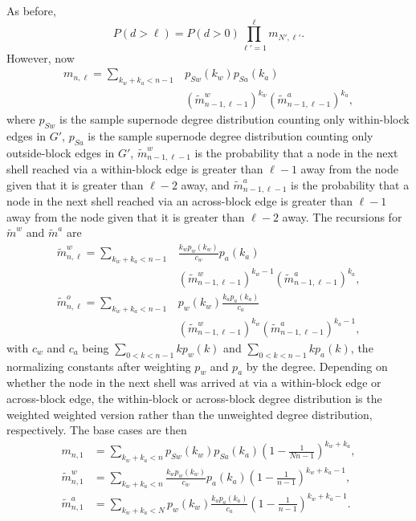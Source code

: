 As before,
\[
P(d > \ell) = P(d > 0) \prod_{\ell'=1}^\ell m_{N', \ell'}.
\]
However, now
\begin{align*}
    m_{n, \ell} = \sum_{k_w + k_a < n-1} &p_{Sw}(k_w) p_{Sa}(k_a) \\
    &\left(\tilde{m}_{n-1, \ell-1}^{w}\right)^{k_w} \left(\tilde{m}_{n-1, \ell-1}^{a}\right)^{k_a},
\end{align*}
where $p_{Sw}$ is the sample supernode degree distribution counting only within-block edges in $G'$, $p_{Sa}$ is the sample supernode degree distribution counting only outside-block edges in $G'$, $\tilde{m}_{n-1, \ell-1}^w$ is the probability that a node in the next shell reached via a within-block edge is greater than $\ell-1$ away from the node given that it is greater than $\ell - 2$ away, and $\tilde{m}_{n-1, \ell-1}^a$ is the probability that a node in the next shell reached via an across-block edge is greater than $\ell-1$ away from the node given that it is greater than $\ell - 2$ away. The recursions for $\tilde{m}^w$ and $\tilde{m}^a$ are
\begin{align*}
    \tilde{m}_{n, \ell}^{w} = \sum_{k_w + k_a < n-1} &\frac{k_w p_w(k_w)}{c_w} p_a(k_a) \\
    &\left(\tilde{m}_{n-1, \ell-1}^{w}\right)^{k_w-1} \left(\tilde{m}_{n-1, \ell-1}^{a}\right)^{k_a}, \\
    \tilde{m}_{n, \ell}^{o} = \sum_{k_w + k_a < n-1} &p_w(k_w) \frac{k_a p_a(k_a)}{c_a} \\
    &\left(\tilde{m}_{n-1, \ell-1}^{w}\right)^{k_w} \left(\tilde{m}_{n-1, \ell-1}^{a}\right)^{k_a-1},
\end{align*}
with $c_w$ and $c_a$ being $\sum_{0 < k < n-1}kp_w(k)$ and $\sum_{0 < k < n-1}kp_a(k)$, the normalizing constants after weighting $p_w$ and $p_a$ by the degree. Depending on whether the node in the next shell was arrived at via a within-block edge or across-block edge, the within-block or across-block degree distribution is the weighted weighted version rather than the unweighted degree distribution, respectively. The base cases are then
\begin{align*}
    m_{n, 1} &= \sum_{k_w + k_a < n} p_{Sw}(k_w) p_{Sa}(k_a) \left(1 - \frac{1}{Nn-1}\right)^{k_w + k_a}, \\
    \tilde{m}_{n,1}^{w} &= \sum_{k_w + k_a < n} \frac{k_w p_w(k_w)}{c_w} p_a(k_a) \left(1 - \frac{1}{n-1}\right)^{k_w + k_a - 1}, \\
    \tilde{m}_{n,1}^{a} &= \sum_{k_w + k_a < N} p_w(k_w) \frac{k_a p_a(k_a)}{c_a} \left(1 - \frac{1}{n-1}\right)^{k_w + k_a - 1}.
\end{align*}

